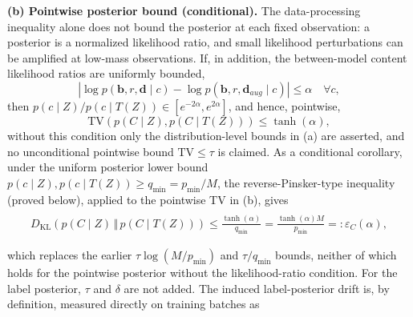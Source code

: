 \documentclass[electronics,article,submit,moreauthors]{Definitions/mdpi}
\newcommand{\add}[1]{\textcolor{addblue}{#1}}
\newcommand{\del}[1]{\textcolor{delred}{\st{#1}}}
\newcommand{\delmath}[1]{\textcolor{delred}{\cancel{#1}}}
\def\add#1{#1}
\def\del#1{}
\def\delmath#1{}
\begin{document}
\begin{itemize}[leftmargin=2.7em,labelwidth=2.3em,labelsep=0.4em,align=left]
\add{\textbf{(b) Pointwise posterior bound (conditional).} The data-processing inequality alone does not bound the posterior at each fixed observation: a posterior is a normalized likelihood ratio, and small likelihood perturbations can be amplified at low-mass observations. If, in addition, the between-model content likelihood ratios are uniformly bounded,}
\begin{equation}
\add{\left|\log p(\mathbf b,r,\mathbf d\mid c)-\log p(\mathbf b,r,\mathbf d_{aug}\mid c)\right|\le\alpha\quad\forall c,}
\end{equation}
\add{then $p(c\mid Z)/p(c\mid T(Z))\in[e^{-2\alpha},e^{2\alpha}]$, and hence, pointwise,}
\begin{equation}
\add{\mathrm{TV}\!\left(p(C\mid Z),p(C\mid T(Z))\right)\le\tanh(\alpha),}
\label{eq:pointtv}
\end{equation}
\add{without this condition only the distribution-level bounds in (a) are asserted, and no unconditional pointwise bound $\mathrm{TV}\le\tau$ is claimed. As a conditional corollary, under the uniform posterior lower bound $p(c\mid Z),p(c\mid T(Z))\ge q_{\min}=p_{\min}/M$, the reverse-Pinsker-type inequality (proved below), applied to the pointwise TV in (b), gives}
\begin{equation}
\begin{gathered}
\delmath{D_{\mathrm{KL}}\!\left(p(C\mid Z)\,\Vert\,p(C\mid T(Z))\right)\le \frac{\tau}{q_{\min}}=\frac{\tau M}{p_{\min}}=:\varepsilon_C(\tau),}\\
\add{D_{\mathrm{KL}}\!\left(p(C\mid Z)\,\Vert\,p(C\mid T(Z))\right)\le\frac{\tanh(\alpha)}{q_{\min}}=\frac{\tanh(\alpha)M}{p_{\min}}=:\varepsilon_C(\alpha),}
\end{gathered}
\label{eq:klcorollary}
\end{equation}
\del{using the reverse-Pinsker-type inequality \mbox{$D_{\mathrm{KL}}(P\Vert Q)\le \mathrm{TV}(P,Q)/q_{\min}$} (proved below); note that this replaces the earlier \mbox{$\tau\log(M/p_{\min})$} bound, which is not valid in general. For the label posterior, when the divergence \mbox{$D$} of Assumption~2(iii) is total variation, the triangle inequality gives}
\add{which replaces the earlier $\tau\log(M/p_{\min})$ and $\tau/q_{\min}$ bounds, neither of which holds for the pointwise posterior without the likelihood-ratio condition. For the label posterior, $\tau$ and $\delta$ are not added. The induced label-posterior drift is, by definition, measured directly on training batches as}
\begin{equation}
\begin{gathered}

\end{gathered}
\end{equation}
\end{itemize}
\end{document}
